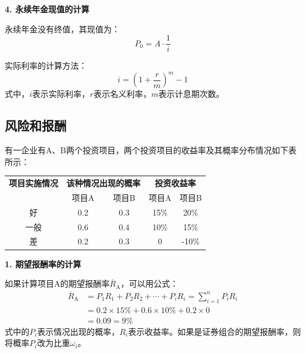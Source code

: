 \documentclass[
  10pt,
  twoside,
  openany,
  b5paper, %
  colorscheme = black, %
  xits = false,
]{qyxf-book}
\begin{document}
\textbf{4. 永续年金现值的计算}

永续年金没有终值，其现值为：
\begin{equation*}
	P_0 = A \cdot \frac{1}{i}
\end{equation*}

\begin{note}
	实际利率的计算方法：
	\begin{equation*}
		i = \left(1+\frac{r}{m}\right)^m-1
	\end{equation*}
式中，$i$表示实际利率，$r$表示名义利率，$m$表示计息期次数。
\end{note}

\newpage

\subsection{风险和报酬}

有一企业有A、B两个投资项目，两个投资项目的收益率及其概率分布情况如下表所示：

\begin{table}[htbp]
	\centering
	\begin{tabular}{ccccc}
		\toprule
		\textbf{项目实施情况} & \multicolumn{2}{c}{\textbf{该种情况出现的概率}} & \multicolumn{2}{c}{\textbf{投资收益率}} \\
		\cmidrule{2-5}
		& 项目A & 项目B & 项目A & 项目B \\
		\midrule
		好 & 0.2 & 0.3 & 15\% & 20\% \\
		一般 & 0.6 & 0.4 & 10\% & 15\% \\
		差 & 0.2 & 0.3 & 0 & -10\% \\
		\bottomrule
	\end{tabular}
\end{table}

\textbf{1. 期望报酬率的计算}

如果计算项目A的期望报酬率$\overline{R}_\mathrm{A}$，可以用公式：
\begin{equation*}
	\begin{aligned}
		\overline{R}_\mathrm{A} & = P_1R_1 + P_2R_2 + \cdots + P_iR_i = \sum_{i=1}^{n} P_iR_i \\
					 & = 0.2 \times 15\% + 0.6 \times 10\% + 0.2 \times 0 \\
					 & = 0.09 =9\%
	\end{aligned}
\end{equation*}
式中的$P_i$表示情况出现的概率，$R_i$表示收益率。如果是证券组合的期望报酬率，则将概率$P_i$改为比重$\omega_i$。
\end{document}
